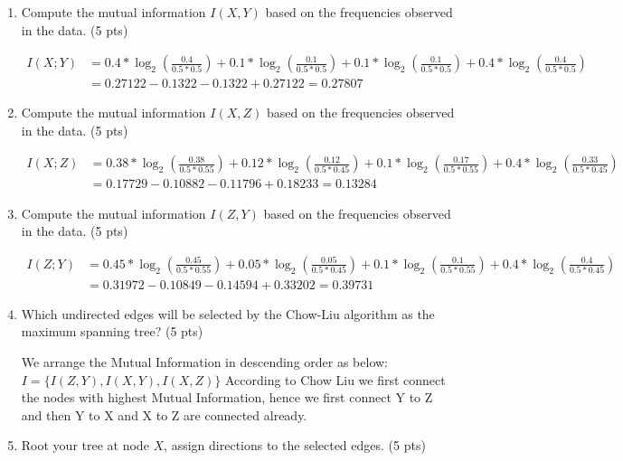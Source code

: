 \documentclass[a4paper]{article}
\theoremstyle{definition}
\newenvironment{soln}{
	\leavevmode\color{blue}\ignorespaces
}{}
\begin{document}
\begin{enumerate}
	\item Compute the mutual information $I(X, Y)$ based on the frequencies observed in the data. (5 pts)
        \begin{soln}
            \begin{align*}
                I(X;Y) &= 0.4*\log_2(\frac{0.4}{0.5*0.5})+0.1*\log_2(\frac{0.1}{0.5*0.5})+0.1*\log_2(\frac{0.1}{0.5*0.5})+0.4*\log_2(\frac{0.4}{0.5*0.5}) \\
                &= 0.27122 - 0.1322 - 0.1322 + 0.27122 = \mathbf{0.27807}
            \end{align*}
        \end{soln}
	\item Compute the mutual information $I(X, Z)$ based on the frequencies observed in the data. (5 pts)
        \begin{soln}
            \begin{align*}
                I(X;Z) &= 0.38*\log_2(\frac{0.38}{0.5*0.55})+0.12*\log_2(\frac{0.12}{0.5*0.45})+0.1*\log_2(\frac{0.17}{0.5*0.55})+0.4*\log_2(\frac{0.33}{0.5*0.45}) \\
                &= 0.17729 - 0.10882 - 0.11796 + 0.18233 = \mathbf{0.13284}
            \end{align*}
        \end{soln}
	\item Compute the mutual information $I(Z, Y)$ based on the frequencies observed in the data. (5 pts)
        \begin{soln}
            \begin{align*}
                I(Z;Y) &= 0.45*\log_2(\frac{0.45}{0.5*0.55})+0.05*\log_2(\frac{0.05}{0.5*0.45})+0.1*\log_2(\frac{0.1}{0.5*0.55})+0.4*\log_2(\frac{0.4}{0.5*0.45}) \\
                &= 0.31972 - 0.10849 - 0.14594 + 0.33202  = \mathbf{0.39731}
            \end{align*}
        \end{soln}
	\item Which undirected edges will be selected by the Chow-Liu algorithm as the maximum spanning tree? (5 pts)
        \begin{soln}
            We arrange the Mutual Information in descending order as below:\\
            $I=\{I(Z,Y),I(X,Y),I(X,Z)\}$
            According to Chow Liu we first connect the nodes with highest Mutual Information, hence we first connect Y to Z and then Y to X and X to Z are connected already.
            
            
        \end{soln}
	\item Root your tree at node $X$, assign directions to the selected edges. (5 pts)
        
        \begin{soln}
            
        \end{soln}
\end{enumerate}

	
	
\end{document}
